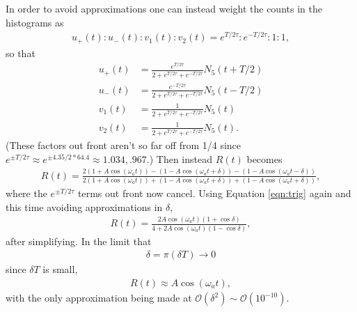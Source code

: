 In order to avoid approximations one can instead weight the counts in the histograms as
	\begin{align}
		u_{+}(t) : u_{-}(t) : v_{1}(t) : v_{2}(t) = e^{T/2\tau} : e^{-T/2\tau} : 1 : 1,
	\label{Eqn:Weighting}
	\end{align}
so that
	\begin{equation}
	\begin{aligned}
		u_{+}(t) &= \frac{e^{T/2\tau}}{2 + e^{T/2\tau} + e^{-T/2\tau}} N_{5}(t+T/2) \\
		u_{-}(t) &= \frac{e^{-T/2\tau}}{2 + e^{T/2\tau} + e^{-T/2\tau}} N_{5}(t-T/2) \\
		v_{1}(t) &= \frac{1}{2 + e^{T/2\tau} + e^{-T/2\tau}} N_{5}(t) \\
		v_{2}(t) &= \frac{1}{2 + e^{T/2\tau} + e^{-T/2\tau}} N_{5}(t).
	\label{eqn:fourHists}
	\end{aligned}
	\end{equation}
(These factors out front aren't so far off from 1/4 since $e^{\pm T/ 2\tau} \approx e^{\pm 4.35/ 2*64.4} \approx 1.034, .967$.) Then instead $R(t)$ becomes 
	\begin{align}
		R(t) = \frac{2(1 + A \cos(\omega_{a}t)) - (1 - A \cos(\omega_{a}t + \delta)) - (1 - A \cos(\omega_{a}t - \delta))} {2(1 + A \cos(\omega_{a}t)) + (1 - A \cos(\omega_{a}t + \delta)) + (1 - A \cos(\omega_{a}t + \delta))},
	\end{align}
where the $e^{\pm T/ 2\tau}$ terms out front now cancel. Using Equation \ref{eqn:trig} again and this time avoiding approximations in $\delta$,
	\begin{align}
		R(t) = \frac{2A \cos(\omega_{a}t) (1 + \cos{\delta} )} {4 + 2A \cos(\omega_{a}t) (1 - \cos{\delta} )},
	\end{align}
after simplifying. In the limit that 
	\begin{align}
		\delta = \pi (\delta T) \rightarrow 0
	\end{align}
since $\delta T$ is small, 
	\begin{align}
		R(t) \approx A \cos(\omega_{a}t),
	\end{align}
with the only approximation being made at $\mathcal{O}(\delta^{2}) \sim \mathcal{O}(10^{-10})$.

